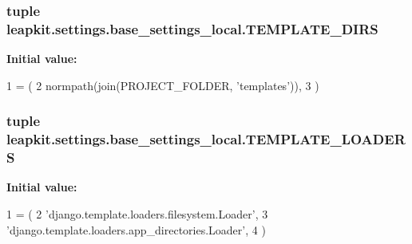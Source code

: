 \hypertarget{namespaceleapkit_1_1settings_1_1base__settings__local_a6c20dac1e8a2669ee57c65b45fb66bbf}{
\subsubsection[{T\-E\-M\-P\-L\-A\-T\-E\-\_\-\-D\-I\-R\-S}]{\setlength{\rightskip}{0pt plus 5cm}tuple leapkit.\-settings.\-base\-\_\-settings\-\_\-local.\-T\-E\-M\-P\-L\-A\-T\-E\-\_\-\-D\-I\-R\-S}}\label{namespaceleapkit_1_1settings_1_1base__settings__local_a6c20dac1e8a2669ee57c65b45fb66bbf}
{\bfseries Initial value\-:}
\begin{DoxyCode}
1 = (
2     normpath(join(PROJECT\_FOLDER, \textcolor{stringliteral}{'templates'})),
3 )
\end{DoxyCode}
\hypertarget{namespaceleapkit_1_1settings_1_1base__settings__local_a4d3aea07c3fb548eda4abf846e9f396f}{
\subsubsection[{T\-E\-M\-P\-L\-A\-T\-E\-\_\-\-L\-O\-A\-D\-E\-R\-S}]{\setlength{\rightskip}{0pt plus 5cm}tuple leapkit.\-settings.\-base\-\_\-settings\-\_\-local.\-T\-E\-M\-P\-L\-A\-T\-E\-\_\-\-L\-O\-A\-D\-E\-R\-S}}\label{namespaceleapkit_1_1settings_1_1base__settings__local_a4d3aea07c3fb548eda4abf846e9f396f}
{\bfseries Initial value\-:}
\begin{DoxyCode}
1 = (
2     \textcolor{stringliteral}{'django.template.loaders.filesystem.Loader'},
3     \textcolor{stringliteral}{'django.template.loaders.app\_directories.Loader'},
4 )
\end{DoxyCode}
